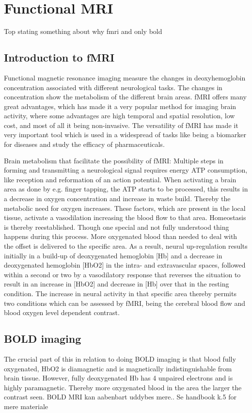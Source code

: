 \section{Functional MRI}

Top stating something about why fmri and only bold 

\subsection{Introduction to fMRI}
Functional magnetic resonance imaging measure the changes in deoxyhemoglobin concentration associated with different neurological tasks. The changes in concentration show the metabolism of the different brain areas. fMRI offers many great advantages, which has made it a very popular method for imaging brain activity, where some advantages are high temporal and spatial resolution, low cost, and most of all it being non-invasive. The versatility of fMRI has made it very important tool which is used in a widespread of tasks like being a biomarker for diseases and study the efficacy of pharmaceuticals.\cite{Glover2011}

Brain metabolism that facilitate the possibility of fMRI: 
Multiple steps in forming and transmitting a neurological signal requires energy ATP consumption, like reception and reformation of an action potential. When activating a brain area as done by e.g. finger tapping, the ATP starts to be processed, this results in a decrease in oxygen concentration and increase in waste build. Thereby the metabolic need for oxygen increases. These factors, which are present in the local tissue, activate a vasodilation increasing the blood flow to that area. Homeostasis is thereby reestablished. Though one special and not fully understood thing happens during this process. More oxygenated blood than needed to deal with the offset is delivered to the specific area. As a result, neural up-regulation results initially in a build-up of deoxygenated hemoglobin [Hb] and a decrease in deoxygenated hemoglobin [HbO2] in the intra- and extravascular spaces, followed within a second or two by a vasodilatory response that reverses the situation to result in an increase in [HbO2] and decrease in [Hb] over that in the resting condition. The increase in neural activity in that specific area thereby permits two conditions which can be assessed by fMRI, being the cerebral blood flow and blood oxygen level dependent contrast.\cite{Glover2011}

\subsection{BOLD imaging}
The crucial part of this in relation to doing BOLD imaging is that blood fully oxygenated, HbO2 is diamagnetic and is magnetically indistinguishable from brain tissue. However, fully deoxygenated Hb has 4 unpaired electrons and is highly paramagnetic.
Thereby more oxygenated blood in the area the larger the contrast seen.  
\cite{Glover2011}
BOLD MRI kan aabenbart uddybes mere.. Se handbook k.5 for mere materiale

